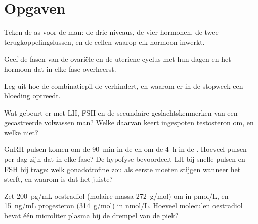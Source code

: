 \section{Opgaven}

\begin{exercise}[$\star$]\label{exo:b2:reproductive-hormones:1}
Teken de as voor de man: de drie niveaus, de vier hormonen, de twee
terugkoppelingslussen, en de cellen waarop elk hormoon inwerkt.
\end{exercise}

\begin{exercise}[$\star$]\label{exo:b2:reproductive-hormones:2}
Geef de fasen van de ovariële en de uteriene cyclus met hun dagen en het
hormoon dat in elke fase overheerst.
\end{exercise}

\begin{exercise}[$\star$]\label{exo:b2:reproductive-hormones:3}
Leg uit hoe de combinatiepil de  verhindert, en waarom er in de
stopweek een bloeding optreedt.
\end{exercise}

\begin{exercise}[$\star$]\label{exo:b2:reproductive-hormones:4}
Wat gebeurt er met LH, FSH en de secundaire geslachtskenmerken van een
gecastreerde volwassen man? Welke daarvan keert ingespoten testosteron om,
en welke niet?
\end{exercise}

\begin{exercise}[$\star\star$]\label{exo:b2:reproductive-hormones:5}
GnRH-pulsen komen om de \qty{90}{min} in de  en om de
\qty{4}{h} in de . Hoeveel pulsen per dag zijn dat in elke fase?
De hypofyse bevoordeelt LH bij snelle pulsen en FSH bij trage: welk
gonadotrofine zou als eerste moeten stijgen wanneer het 
sterft, en waarom is dat het juiste?
\end{exercise}

\begin{exercise}[$\star\star$]\label{exo:b2:reproductive-hormones:6}
Zet \qty{200}{pg/mL} oestradiol (molaire massa
\qty{272}{g/mol}) om in \unit{pmol/L}, en \qty{15}{ng/mL}
progesteron (\qty{314}{g/mol}) in \unit{nmol/L}. Hoeveel
moleculen oestradiol bevat één microliter plasma bij de drempel van de
piek?
\end{exercise}

